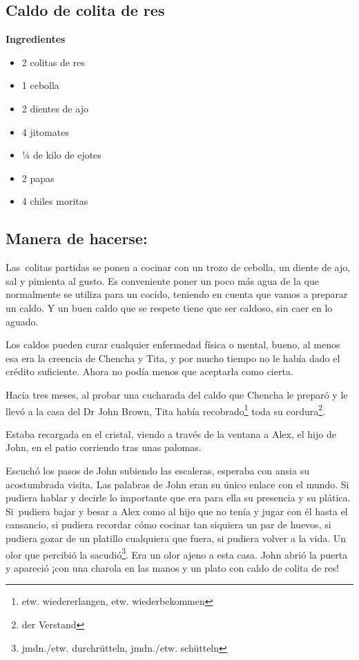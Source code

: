 \subsection*{ Caldo de colita de res }
\textbf{Ingredientes}
\begin{itemize}
    \item 2 colitas de res
    \item 1 cebolla
    \item 2 dientes de ajo
    \item 4 jitomates
    \item ¼ de kilo de ejotes
    \item 2 papas
    \item 4 chiles moritas
\end{itemize}

\subsection*{ Manera de hacerse: }
Las~colitas partidas se ponen a cocinar con un trozo de cebolla,
un diente de ajo, sal y pimienta al gusto. Es conveniente poner un poco
más agua de la que normalmente se utiliza para un cocido, teniendo en
cuenta que vamos a preparar un caldo. Y un buen caldo que se respete
tiene que ser caldoso, sin caer en lo aguado.

Los caldos pueden curar cualquier enfermedad física o mental, bueno, al
menos esa era la creencia de Chencha y Tita, y por mucho tiempo no le
había dado el crédito suficiente. Ahora no podía menos que aceptarla
como cierta.

Hacía tres meses, al probar una cucharada del caldo que Chencha le
preparó y le llevó a la casa del Dr John Brown, Tita había recobrado\footnote{etw. wiedererlangen, etw. wiederbekommen}
toda su cordura\footnote{der Verstand}.

Estaba recargada en el cristal,
viendo a través de la ventana a Alex, el hijo de John, en el patio corriendo
tras unas palomas.

Escuchó los pasos de John subiendo las escaleras, esperaba con ansia su
acostumbrada visita. Las palabras de John eran su único enlace con el
mundo. Si pudiera hablar y decirle lo importante que era para ella su presencia
y su plática. Si~pudiera bajar y besar a Alex como al hijo que no
tenía y jugar con él hasta el cansancio, si pudiera recordar cómo
cocinar tan siquiera un par de huevos, si pudiera gozar de un platillo
cualquiera que fuera, si pudiera \ndots volver a la vida. Un olor que
percibió la sacudió\footnote{jmdn./etw. durchrütteln, jmdn./etw. schütteln}.
Era un olor ajeno a esta casa. John abrió la puerta y apareció ¡con una
charola en las manos y un plato con caldo de colita de res!

